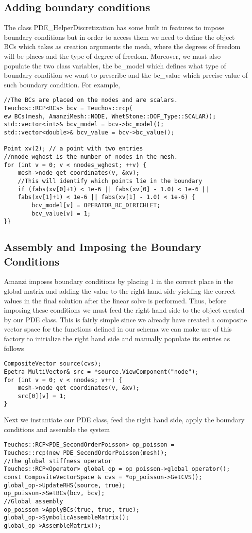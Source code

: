 \subsection{Adding boundary conditions}\label{Sec:AddingBoundaryCond}
The class PDE\_HelperDiscretization has some built in features to impose boundary conditions but in order to access them we need to define the object BCs which takes as creation arguments the mesh, where the degrees of freedom will be places and the type of degree of freedom. Moreover, we must also populate the two class variables, the bc\_model which defines what type of boundary condition we want to prescribe and the bc\_value which precise value of such boundary condition. For example,
%
\begin{lstlisting}
//The BCs are placed on the nodes and are scalars.
Teuchos::RCP<BCs> bcv = Teuchos::rcp(
ew BCs(mesh, AmanziMesh::NODE, WhetStone::DOF_Type::SCALAR));
std::vector<int>& bcv_model = bcv->bc_model();
std::vector<double>& bcv_value = bcv->bc_value();

Point xv(2); // a point with two entries
//nnode_wghost is the number of nodes in the mesh.
for (int v = 0; v < nnodes_wghost; ++v) {
	mesh->node_get_coordinates(v, &xv);
	//This will identify which points lie in the boundary
	if (fabs(xv[0]+1) < 1e-6 || fabs(xv[0] - 1.0) < 1e-6 ||
	fabs(xv[1]+1) < 1e-6 || fabs(xv[1] - 1.0) < 1e-6) {
		bcv_model[v] = OPERATOR_BC_DIRICHLET;
		bcv_value[v] = 1;
}}
\end{lstlisting}
\subsection{Assembly and Imposing the Boundary Conditions}\label{Sec:AssemblyAndBoundaryCond}
%
Amanzi imposes boundary conditions by placing $1$ in the correct place in the global matrix and adding the value to the right hand side yielding the correct values in the final solution after the linear solve is performed. Thus, before imposing these conditions we must feed the right hand side to the object created by our PDE class. This is fairly simple since we already have created a composite vector space for the functions defined in our schema we can make use of this factory to initialize the right hand side and manually populate its entries as follows
%
\begin{lstlisting}
CompositeVector source(cvs);
Epetra_MultiVector& src = *source.ViewComponent("node");
for (int v = 0; v < nnodes; v++) {
	mesh->node_get_coordinates(v, &xv);
	src[0][v] = 1;
}
\end{lstlisting}
%
Next we instantiate our PDE class, feed the right hand side, apply the boundary conditions and assemble the system
%
\begin{lstlisting}
Teuchos::RCP<PDE_SecondOrderPoisson> op_poisson = 
Teuchos::rcp(new PDE_SecondOrderPoisson(mesh));
//The global stiffness operator
Teuchos::RCP<Operator> global_op = op_poisson->global_operator();
const CompositeVectorSpace & cvs = *op_poisson->GetCVS();
global_op->UpdateRHS(source, true);
op_poisson->SetBCs(bcv, bcv);
//Global assembly
op_poisson->ApplyBCs(true, true, true);
global_op->SymbolicAssembleMatrix();
global_op->AssembleMatrix();
\end{lstlisting}
%
